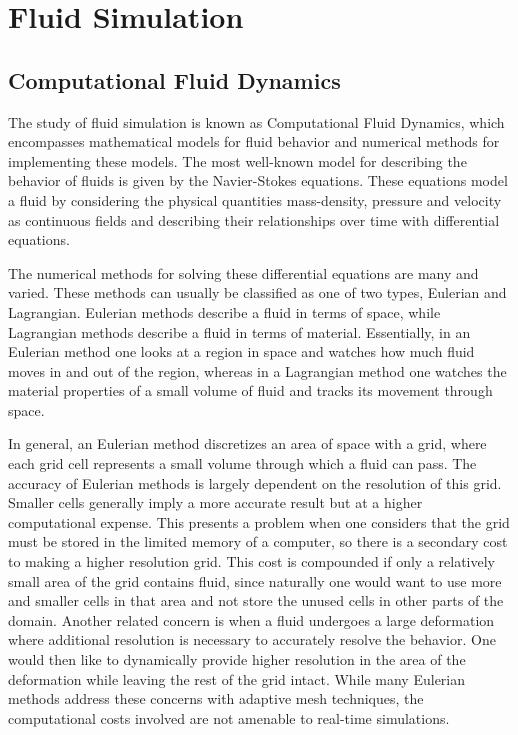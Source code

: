 \chapter{Fluid Simulation}

\section{Computational Fluid Dynamics}

The study of fluid simulation is known as Computational Fluid Dynamics, which
encompasses mathematical models for fluid behavior and numerical methods for
implementing these models. The most well-known model for describing the
behavior of fluids is given by the Navier-Stokes equations. These equations
model a fluid by considering the physical quantities mass-density, pressure and
velocity as continuous fields and describing their relationships over time with
differential equations.


The numerical methods for solving these differential equations are many and
varied. These methods can usually be classified as one of two types, Eulerian
and Lagrangian. Eulerian methods describe a fluid in terms of space, while
Lagrangian methods describe a fluid in terms of material. Essentially, in an
Eulerian method one looks at a region in space and watches how much fluid moves
in and out of the region, whereas in a Lagrangian method one watches the
material properties of a small volume of fluid and tracks its movement through
space.


In general, an Eulerian method discretizes an area of space with a grid, where
each grid cell represents a small volume through which a fluid can pass. The
accuracy of Eulerian methods is largely dependent on the resolution of this
grid. Smaller cells generally imply a more accurate result but at a higher
computational expense. This presents a problem when one considers that the grid
must be stored in the limited memory of a computer, so there is a secondary
cost to making a higher resolution grid. This cost is compounded if only a
relatively small area of the grid contains fluid, since naturally one would want to
use more and smaller cells in that area and not store the unused cells in other
parts of the domain. Another related concern is when a fluid undergoes a large
deformation where additional resolution is necessary to accurately resolve the
behavior. One would then like to dynamically provide higher resolution in the area
of the deformation while leaving the rest of the grid intact.  While many
Eulerian methods address these concerns with adaptive mesh techniques, the
computational costs involved are not amenable to real-time simulations. 


